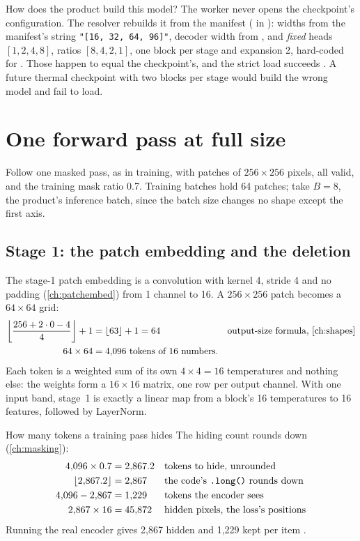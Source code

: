 How does the product build this model? The worker never opens the checkpoint's configuration. The resolver
rebuilds it from the manifest ( in
): widths from the manifest's  string
\lstinline!"[16, 32, 64, 96]"!, decoder width from , and \emph{fixed} heads $[1,2,4,8]$, ratios
$[8,4,2,1]$, one block per stage and expansion 2, hard-coded for . Those happen to equal the
checkpoint's, and the strict load succeeds \tagC. A future thermal checkpoint with two blocks per stage would build
the wrong model and fail to load.

\section{One forward pass at full size}\label{sec:chakshu:trace}

Follow one masked pass, as in training, with patches of $256\times256$ pixels, all valid, and the training mask
ratio 0.7. Training batches hold 64 patches; take $B=8$, the product's inference batch, since the batch size changes
no shape except the first axis.

\subsection{Stage 1: the patch embedding and the deletion}

The stage-1 patch embedding is a convolution with kernel 4, stride 4 and no padding (\cref{ch:patchembed}) from 1
channel to 16. A $256\times256$ patch becomes a $64\times64$ grid:
\begin{align*}
\left\lfloor\frac{256+2\cdot0-4}{4}\right\rfloor+1 &= \lfloor 63\rfloor+1 = 64 && \text{output-size formula, \cref{ch:shapes}}\\
64\times64 &= 4{,}096 \text{ tokens of 16 numbers.}
\end{align*}
Each token is a weighted sum of its own $4\times4=16$ temperatures and nothing else: the weights form a $16\times16$
matrix, one row per output channel. With one input band, stage~1 is exactly a linear map from a block's 16
temperatures to 16 features, followed by LayerNorm.

\begin{worked}[label={we:chakshu:mask}]{How many tokens a training pass hides}
The hiding count rounds down (\cref{ch:masking}):
\begin{align*}
4{,}096\times0.7 &= 2{,}867.2 && \text{tokens to hide, unrounded}\\
\lfloor2{,}867.2\rfloor &= 2{,}867 && \text{the code's \texttt{.long()} rounds down}\\
4{,}096-2{,}867 &= 1{,}229 && \text{tokens the encoder sees}\\
2{,}867\times16 &= 45{,}872 && \text{hidden pixels, the loss's positions}
\end{align*}
Running the real encoder gives 2,867 hidden and 1,229 kept per item \tagC.
\end{worked}

